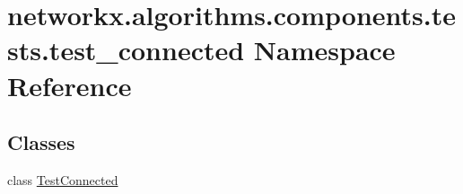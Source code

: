 \hypertarget{namespacenetworkx_1_1algorithms_1_1components_1_1tests_1_1test__connected}{}\section{networkx.\+algorithms.\+components.\+tests.\+test\+\_\+connected Namespace Reference}
\label{namespacenetworkx_1_1algorithms_1_1components_1_1tests_1_1test__connected}
\subsection*{Classes}
\begin{DoxyCompactItemize}
\item 
class \hyperlink{classnetworkx_1_1algorithms_1_1components_1_1tests_1_1test__connected_1_1TestConnected}{Test\+Connected}
\end{DoxyCompactItemize}
